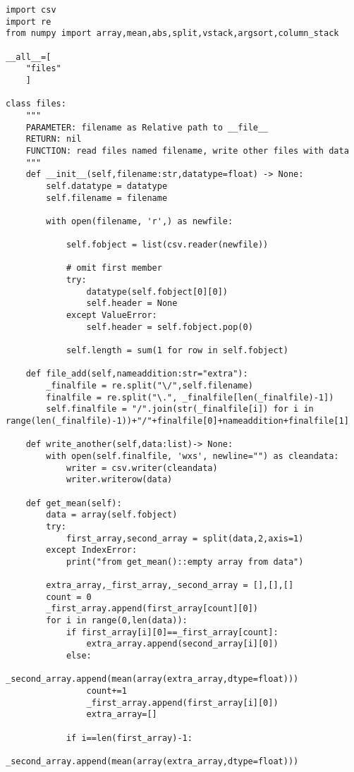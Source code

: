 \documentclass[12pt]{article}
\begin{document}
\begin{verbatim}
import csv
import re
from numpy import array,mean,abs,split,vstack,argsort,column_stack

__all__=[
    "files"
    ]

class files:
    """
    PARAMETER: filename as Relative path to __file__
    RETURN: nil
    FUNCTION: read files named filename, write other files with data
    """
    def __init__(self,filename:str,datatype=float) -> None:
        self.datatype = datatype
        self.filename = filename

        with open(filename, 'r',) as newfile:
            
            self.fobject = list(csv.reader(newfile))
            
            # omit first member
            try:
                datatype(self.fobject[0][0])
                self.header = None
            except ValueError:
                self.header = self.fobject.pop(0)
                
            self.length = sum(1 for row in self.fobject)
            
    def file_add(self,nameaddition:str="extra"):
        _finalfile = re.split("\/",self.filename)
        finalfile = re.split("\.", _finalfile[len(_finalfile)-1])
        self.finalfile = "/".join(str(_finalfile[i]) for i in range(len(_finalfile)-1))+"/"+finalfile[0]+nameaddition+finalfile[1]
    
    def write_another(self,data:list)-> None:
        with open(self.finalfile, 'wxs', newline="") as cleandata:
            writer = csv.writer(cleandata)
            writer.writerow(data)
    
    def get_mean(self):
        data = array(self.fobject)
        try:
            first_array,second_array = split(data,2,axis=1)
        except IndexError:
            print("from get_mean()::empty array from data")
            
        extra_array,_first_array,_second_array = [],[],[]
        count = 0
        _first_array.append(first_array[count][0])
        for i in range(0,len(data)):
            if first_array[i][0]==_first_array[count]:
                extra_array.append(second_array[i][0])
            else:
                _second_array.append(mean(array(extra_array,dtype=float)))
                count+=1
                _first_array.append(first_array[i][0])
                extra_array=[]

            if i==len(first_array)-1:
                _second_array.append(mean(array(extra_array,dtype=float)))


\end{verbatim}
\end{document}
